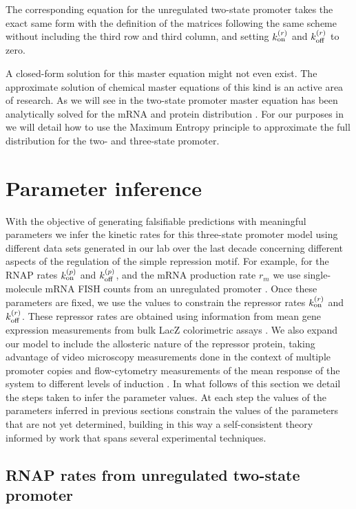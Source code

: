 The corresponding equation for the unregulated two-state promoter takes the
exact same form with the definition of the matrices following the same scheme
without including the third row and third column, and setting $k^{(r)}_{\text{on}}$ and
$k^{(r)}_{\text{off}}$ to zero.

A closed-form solution for this master equation might not even exist. The
approximate solution of chemical master equations of this kind is an active area
of research. As we will see in  the two-state
promoter master equation has been analytically solved for the mRNA
\cite{Peccoud1995} and protein distribution \cite{Shahrezaei2008}. For our
purposes in  we will detail how to use the Maximum Entropy
principle to approximate the full distribution for the two- and three-state
promoter.

\section{Parameter inference}\label{supp_param_inference}

With the objective of generating falsifiable predictions with meaningful
parameters we infer the kinetic rates for this three-state promoter model using
different data sets generated in our lab over the last decade concerning
different aspects of the regulation of the simple repression motif. For example,
for the RNAP rates $k^{(p)}_{\text{on}}$ and $k^{(p)}_{\text{off}}$, and the mRNA production rate $r_m$ we
use single-molecule mRNA FISH counts from an unregulated promoter
\cite{Jones2014a}. Once these parameters are fixed, we use the values to
constrain the repressor rates $k^{(r)}_{\text{on}}$ and $k^{(r)}_{\text{off}}$. These repressor rates are
obtained using information from mean gene expression measurements from bulk LacZ
colorimetric assays \cite{Garcia2011c}. We also expand our model to include the
allosteric nature of the repressor protein, taking advantage of video microscopy
measurements done in the context of multiple promoter copies \cite{Brewster2014}
and flow-cytometry measurements of the mean response of the system to different
levels of induction \cite{Razo-Mejia2018}. In what follows of this section we
detail the steps taken to infer the parameter values. At each step the values of
the parameters inferred in previous sections constrain the values of the
parameters that are not yet determined, building in this way a self-consistent
theory informed by work that spans several experimental techniques.

\subsection{RNAP rates from unregulated two-state promoter}

